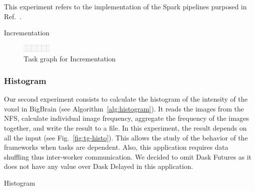 \documentclass[conference]{IEEEtran}
\begin{document}
This experiment refers to the implementation of the Spark pipelines purposed
in Ref.~\cite{Hayot-Sasson:17}.

\begin{algorithm}[!b]
    \caption{Incrementation}\label{alg:incrementation}
    \begin{algorithmic}
        \EndFor
    \EndFor
\end{algorithmic}
\end{algorithm}

\begin{figure}[!b]
    \centering
    \includegraphics[width=0.125\textwidth,
    angle=-90]{images/incrementation-task-graph.png}
    \caption{Task graph for Incrementation}\label{fig:tg-inc}
\end{figure}

\subsubsection{\textbf{Histogram}}
Our second experiment consists to calculate the histogram of the intensity of the
voxel in BigBrain (see Algorithm~\ref{alg:histogram}). It reads the images from the
NFS, calculate individual image frequency, aggregate the frequency of the images
together, and write the result to a file. In this experiment, the result depends on
all the input (see Fig.~\ref{fig:tg-histo}). This allows the study of the behavior of
the frameworks when tasks are dependent. Also, this application requires data
shuffling thus inter-worker communication. We decided to omit Dask Futures as it does
not have any value over Dask Delayed in this application.

\begin{algorithm}[!t]
    \caption{Histogram}\label{alg:histogram}
    \begin{algorithmic}
    \EndFor
    

    \end{algorithmic}
\end{algorithm}
\end{document}
